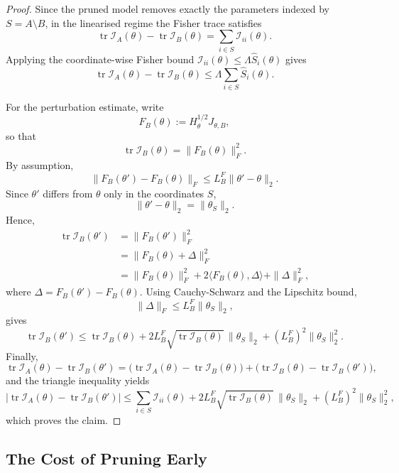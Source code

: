 \documentclass{article}
\theoremstyle{definition}
\theoremstyle{remark}
\begin{document}
\begin{proof}
Since the pruned model removes exactly the parameters indexed by
\(S=A\setminus B\), in the linearised regime the Fisher trace satisfies
\[
\operatorname{tr}\mathcal I_A(\theta)
-
\operatorname{tr}\mathcal I_B(\theta)
=
\sum_{i\in S}\mathcal I_{ii}(\theta).
\]
Applying the coordinate-wise Fisher bound
\(
\mathcal I_{ii}(\theta)\le
\Lambda\widehat S_i(\theta)
\)
gives
\[
\operatorname{tr}\mathcal I_A(\theta)
-
\operatorname{tr}\mathcal I_B(\theta)
\le
\Lambda
\sum_{i\in S}\widehat S_i(\theta).
\]

For the perturbation estimate, write
\[
F_B(\theta)
:=
H_\theta^{1/2}J_{\theta,B},
\]
so that
\[
\operatorname{tr}\mathcal I_B(\theta)
=
\|F_B(\theta)\|_F^2.
\]
By assumption,
\[
\|F_B(\theta')-F_B(\theta)\|_F
\le
L_B^F
\|\theta'-\theta\|_2.
\]
Since \(\theta'\) differs from \(\theta\) only in the coordinates
\(S\),
\[
\|\theta'-\theta\|_2=\|\theta_S\|_2.
\]
Hence,
\begin{align*}
\operatorname{tr}\mathcal I_B(\theta')
&=
\|F_B(\theta')
\|_F^2                                                   \\
&=
\|F_B(\theta)+\Delta\|_F^2                               \\
&=
\|F_B(\theta)\|_F^2
+
2\langle F_B(\theta),\Delta\rangle
+
\|\Delta\|_F^2,
\end{align*}
where
\(
\Delta=F_B(\theta')-F_B(\theta)
\).
Using Cauchy-Schwarz and the Lipschitz bound,
\[
\|\Delta\|_F
\le
L_B^F\|\theta_S\|_2,
\]
gives
\[
\operatorname{tr}\mathcal I_B(\theta')
\le
\operatorname{tr}\mathcal I_B(\theta)
+
2L_B^F
\sqrt{\operatorname{tr}\mathcal I_B(\theta)}
\,
\|\theta_S\|_2
+
(L_B^F)^2
\|\theta_S\|_2^2.
\]
Finally,
\[
\operatorname{tr}\mathcal I_A(\theta)
-
\operatorname{tr}\mathcal I_B(\theta')
=
\bigl(
\operatorname{tr}\mathcal I_A(\theta)
-
\operatorname{tr}\mathcal I_B(\theta)
\bigr)
+
\bigl(
\operatorname{tr}\mathcal I_B(\theta)
-
\operatorname{tr}\mathcal I_B(\theta')
\bigr),
\]
and the triangle inequality yields
\[
\left|
\operatorname{tr}\mathcal I_A(\theta)
-
\operatorname{tr}\mathcal I_B(\theta')
\right|
\le
\sum_{i\in S}\mathcal I_{ii}(\theta)
+
2L_B^F
\sqrt{\operatorname{tr}\mathcal I_B(\theta)}
\,
\|\theta_S\|_2
+
(L_B^F)^2
\|\theta_S\|_2^2,
\]
which proves the claim.
\end{proof}

\subsection{The Cost of Pruning Early}
\label{subsec:early-prune-bound}
\end{document}
